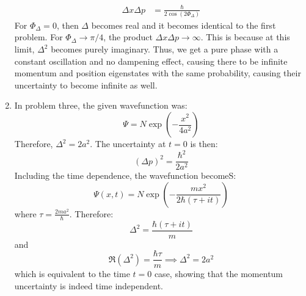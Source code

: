 \begin{sol}
\begin{enumerate}[label=\textbf{(\alph*)}]
\begin{align*}
    \Delta x\Delta p &= \frac{\hbar}{2\cos(2\Phi_\Delta)}
\end{align*}
For $\Phi_\Delta=0$, then $\Delta$ becomes real and it becomes identical to the first problem. For $\Phi_\Delta \to \pi/4$, the product $\Delta x\Delta p \to \infty$. This is because at this limit, $\Delta^2$ becomes purely imaginary. Thus, we get a pure phase with a constant oscillation and no dampening effect, causing there to be infinite momentum and position eigenstates with the same probability, causing their uncertainty to become infinite as well. 
\item In problem three, the given wavefunction was:
$$\Psi = N\exp\left(-\frac{x^2}{4a^2}\right)$$
Therefore, $\Delta^2=2a^2$. The uncertainty at $t=0$ is then:
$$(\Delta p)^2=\frac{\hbar^2}{2a^2}$$
Including the time dependence, the wavefunction becomeS:
$$\Psi(x,t)=N\exp\left(-\frac{mx^2}{2\hbar(\tau+it)}\right)$$
where $\tau=\frac{2ma^2}{\hbar}$. Therefore:
$$
\Delta^2 = \frac{\hbar(\tau+it)}{m}
$$
and
$$
\Re(\Delta^2)=\frac{\hbar\tau}{m} \implies \Delta^2=2a^2
$$
which is equivalent to the time $t=0$ case, showing that the momentum uncertainty is indeed time independent.
\end{enumerate}
\end{sol}